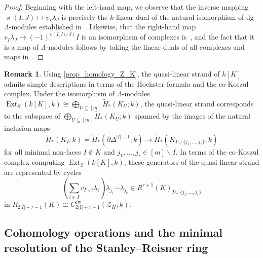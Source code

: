 \documentclass[a4paper,10pt]{amsart}
\theoremstyle{definition}
\newtheorem{remark}[theorem]{Remark}
\theoremstyle{remark}
\DeclareMathOperator{\Ext}{Ext}
\begin{document}
\begin{proof} 
Beginning with the left-hand map, we observe that the inverse mapping $\varkappa(I,J) \mapsto v_I\lambda_J$ is precisely the $k$-linear dual of the natural isomorphism of dg $\Lambda$-modules established in~\cite[Lemma~3.3]{AB}. Likewise, that the right-hand map $v_I\lambda_J \mapsto (-1)^{\varepsilon(I,I\cup J)}I$ is an isomorphism of complexes is~\cite[Theorem~3.2.9]{BP}, and the fact that it is a map of $\Lambda$-modules follows by taking the linear duals of all complexes and maps in~\cite[Lemma~3.5]{AB}.
\end{proof}

\begin{remark} \label{rem_Hoch_strand}
Using \cref{prop_homology_Z_K}, the quasi-linear strand of $k[K]$ admits simple descriptions in terms of the Hochster formula and the co-Koszul complex. Under the isomorphism of $\Lambda$-modules $\Ext_S(k[K],k)\cong\bigoplus_{U\subseteq[m]}\widetilde{H}_*(K_U;k)$, the quasi-linear strand corresponds to the subspace of $\bigoplus_{U\subseteq[m]}\widetilde{H}_*(K_U;k)$ spanned by the images of the natural inclusion maps 
\[
\widetilde{H}_*(K_I;k)=\widetilde{H}_*(\partial\Delta^{|I|-1};k) \longrightarrow \widetilde{H}_*(K_{I\cup\{j_1,\ldots,j_r\}};k)
\]
for all minimal non-faces $I\notin K$ and $j_1,\ldots,j_r\in [m]\smallsetminus I$. In terms of the co-Koszul complex computing $\Ext_S(k[K],k)$, these generators of the quasi-linear strand are represented by cycles
\[
\left( \sum_{i\in I} v_{I\smallsetminus i}\lambda_i \right)\lambda_{j_1}\!\cdots \lambda_{j_r} \in R^{r+1}(K)_{I\cup\{j_1,\ldots,j_r\}}
\]
in $R_{2|I|+r-1}(K) \cong C^\mathrm{cw}_{2|I|+r-1}(\mathcal{Z}_K;k)$.
\end{remark}



\subsection*{Cohomology operations and the minimal resolution of the Stanley--Reisner ring} 
\end{document}

